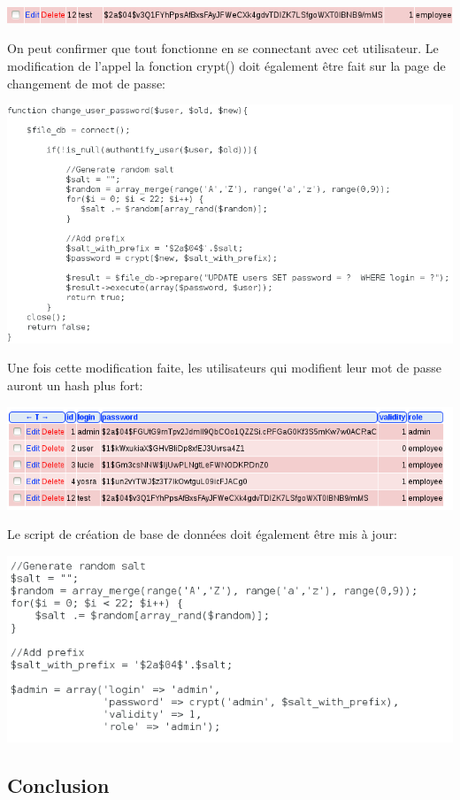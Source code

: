 \documentclass{article}
\begin{document}
\includegraphics{images/crypt_apres2.PNG}

On peut confirmer que tout fonctionne en se connectant avec cet
utilisateur. Le modification de l'appel la fonction crypt() doit
également être fait sur la page de changement de mot de passe:

\includegraphics{images/crypt_apres3.PNG}

Une fois cette modification faite, les utilisateurs qui modifient leur
mot de passe auront un hash plus fort:

\includegraphics{images/crypt_apres4.PNG}

Le script de création de base de données doit également être mis à jour:

\includegraphics{images/crypt_apres5.PNG}

\hypertarget{conclusion}{%
\subsection{Conclusion}\label{conclusion}}
\end{document}
